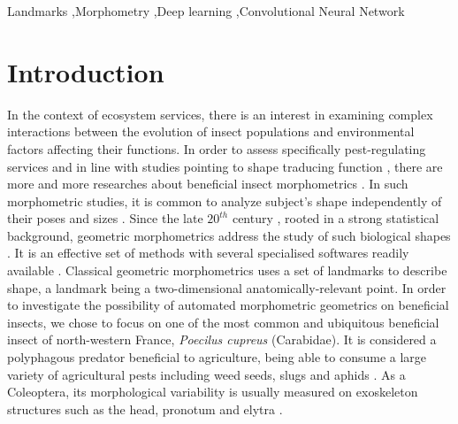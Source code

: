 \documentclass[review]{elsarticle}
\begin{document}
\begin{frontmatter}
\begin{keyword}
Landmarks \sep Morphometry \sep Deep learning \sep Convolutional Neural Network
\end{keyword}

\end{frontmatter}

\linenumbers

\section{Introduction}

In the context of ecosystem services, there is an interest in
examining complex interactions between the evolution of insect
populations and environmental factors affecting their functions. In
order to assess specifically pest-regulating services and in line with
studies pointing to shape traducing function
\cite{klingenberg_evolution_2010}, there are more and more researches
about beneficial insect morphometrics
\cite{sasakawa_utility_2016,raymond_combination_2014}. In such
morphometric studies, it is common to analyze subject's shape 
 independently of their poses and sizes \cite{kendall_diffusion_1977}. Since the late $20^{th}$ century
 \cite{bookstein_foundations_1982}, rooted in a strong statistical
 background, geometric morphometrics address the study of such
 biological shapes \cite{rohlf_applications_1998}. It is an effective
 set of methods with several specialised softwares readily available
 \cite{adams_geomorph:_2013,klingenberg_morphoj:_2011}. Classical
 geometric morphometrics uses a set of landmarks to describe shape, a
 landmark being a two-dimensional anatomically-relevant point. In
 order to investigate the possibility of automated morphometric
 geometrics on beneficial insects, we chose to focus on one of the
 most common and ubiquitous beneficial insect of north-western France,
 \textit{Poecilus cupreus} (Carabidae). It is considered a polyphagous
 predator \cite{larochelle_1990} beneficial to agriculture, being able
 to consume a large variety of agricultural pests including weed
 seeds, slugs and aphids \cite{kromp_carabid_1999}. As a Coleoptera,
 its morphological variability is usually measured on exoskeleton
 structures such as the head, pronotum and elytra
 \cite{eldred_does_2016}.
 
\end{document}
